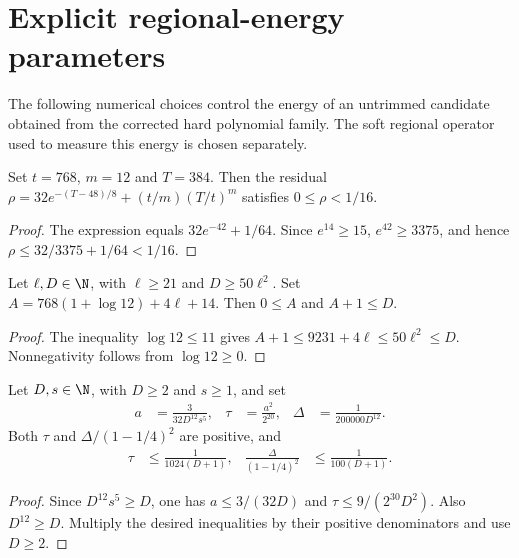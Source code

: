 \section{Explicit regional-energy parameters}

The following numerical choices control the energy of an untrimmed
candidate obtained from the corrected hard polynomial family. The soft
regional operator used to measure this energy is chosen separately.

\begin{theorem}
    \label{thm:soft_regional_fixed_residual}
    \leanok
    Set $t=768$, $m=12$ and $T=384$. Then the residual
    $\rho=32e^{-(T-48)/8}+(t/m)(T/t)^m$ satisfies $0\le\rho<1/16$.
\end{theorem}
\begin{proof}\leanok
    The expression equals $32e^{-42}+1/64$. Since $e^{14}\ge15$,
    $e^{42}\ge3375$, and hence
    $\rho\le32/3375+1/64<1/16$.
\end{proof}

\begin{theorem}
    \label{thm:soft_regional_fixed_norm}
    \leanok
    Let $\ell,D\in\N$, with $\ell\ge21$ and $D\ge50\ell^2$.
    Set $A=768(1+\log12)+4\ell+14$. Then $0\le A$ and $A+1\le D$.
\end{theorem}
\begin{proof}\leanok
    The inequality $\log12\le11$ gives
    $A+1\le9231+4\ell\le50\ell^2\le D$.
    Nonnegativity follows from $\log12\ge0$.
\end{proof}

\begin{theorem}
    \label{thm:soft_regional_filter_precision}
    \leanok
    Let $D,s\in\N$, with $D\ge2$ and $s\ge1$, and set
    \begin{align}
        a      & =\frac3{32D^{12}s^5},  &
        \tau   & =\frac{a^2}{2^{20}},   &
        \Delta & =\frac1{200000D^{12}}.
    \end{align}
    Both $\tau$ and $\Delta/(1-1/4)^2$ are positive, and
    \begin{align}
        \tau                     & \le\frac1{1024(D+1)}, &
        \frac{\Delta}{(1-1/4)^2} & \le\frac1{100(D+1)}.
    \end{align}
\end{theorem}
\begin{proof}\leanok
    Since $D^{12}s^5\ge D$, one has $a\le3/(32D)$ and
    $\tau\le9/(2^{30}D^2)$. Also $D^{12}\ge D$.
    Multiply the desired inequalities by their positive denominators
    and use $D\ge2$.
\end{proof}

